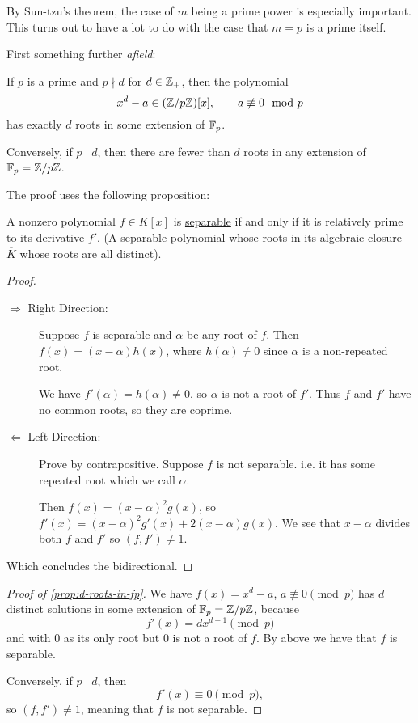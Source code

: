 By Sun-tzu's theorem, the case of $m$ being a prime power is especially important. This turns out to have a lot to do with the case that $m=p$ is a prime itself.

First something further \emph{afield}:
\begin{proposition}\label{prop:d-roots-in-fp}
    If $p$ is a prime and $p\nmid d$ for $d\in\mathbb Z_+$, then the polynomial
    \[x^d - a\in (\mathbb Z/p\mathbb Z)[x],\qquad a\not\equiv 0\mod{p}\]
    has exactly $d$ roots in some extension of $\mathbb F_p$.

    Conversely, if $p\mid d$, then there are fewer than $d$ roots in any extension of $\mathbb F_p = \mathbb Z/p\mathbb Z$.
\end{proposition}

The proof uses the following proposition:
\begin{proposition*}
    A nonzero polynomial $f\in K[x]$ is \ul{separable} if and only if it is relatively prime to its derivative $f'$. (A separable polynomial whose roots in its algebraic closure $\overline{K}$ whose roots are all distinct).
\end{proposition*}
\begin{proof}
    ~\begin{description}
        \item[$\Rightarrow$ Right Direction:]
            Suppose $f$ is separable and $\alpha$ be any root of $f$. Then $f(x) = (x-\alpha)h(x)$, where $h(\alpha)\neq 0$ since $\alpha$ is a non-repeated root.

            We have $f'(\alpha) = h(\alpha)\neq 0$, so $\alpha$ is not a root of $f'$. Thus $f$ and $f'$ have no common roots, so they are coprime.

        \item[$\Leftarrow$ Left Direction:]
            Prove by contrapositive. Suppose $f$ is not separable. i.e. it has some repeated root which we call $\alpha$.

            Then $f(x) = (x-\alpha)^2g(x)$, so $f'(x) = (x-\alpha)^2 g'(x) + 2(x-\alpha)g(x)$. We see that $x-\alpha$ divides both $f$ and $f'$ so $(f, f')\neq 1$.
    \end{description}
    Which concludes the bidirectional.
\end{proof}
\begin{proof}[Proof of \cref{prop:d-roots-in-fp}]
    We have $f(x) = x^d - a$, $a\not\equiv 0\pmod{p}$ has $d$ distinct solutions in some extension of $\mathbb F_p = \mathbb Z/p\mathbb Z$, because \[f'(x) = dx^{d-1}\pmod{p}\] and with $0$ as its only root but $0$ is not a root of $f$. By above we have that $f$ is separable.

    Conversely, if $p\mid d$, then
    \[f'(x)\equiv 0\pmod{p},\]
    so $(f, f')\neq 1$, meaning that $f$ is not separable.
\end{proof}

